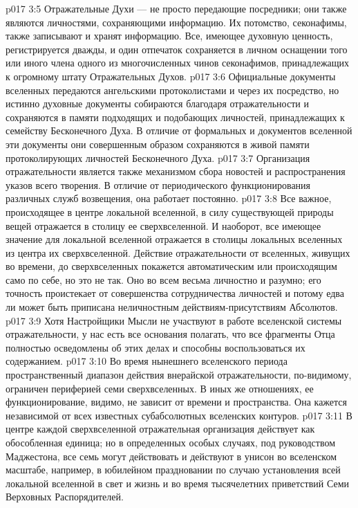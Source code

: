 \vs p017 3:5 \pc Отражательные Духи --- не просто передающие посредники; они также являются личностями, сохраняющими информацию. Их потомство, секонафимы, также записывают и хранят информацию. Все, имеющее духовную ценность, регистрируется дважды, и один отпечаток сохраняется в личном оснащении того или иного члена одного из многочисленных чинов секонафимов, принадлежащих к огромному штату Отражательных Духов.
\vs p017 3:6 Официальные документы вселенных передаются ангельскими протоколистами и через их посредство, но истинно духовные документы собираются благодаря отражательности и сохраняются в памяти подходящих и подобающих личностей, принадлежащих к семейству Бесконечного Духа. В отличие от формальных и  документов вселенной эти документы  они совершенным образом сохраняются в живой памяти протоколирующих личностей Бесконечного Духа.
\vs p017 3:7 Организация отражательности является также механизмом сбора новостей и распространения указов всего творения. В отличие от периодического функционирования различных служб возвещения, она работает постоянно.
\vs p017 3:8 Все важное, происходящее в центре локальной вселенной, в силу существующей природы вещей отражается в столицу ее сверхвселенной. И наоборот, все имеющее значение для локальной вселенной отражается в столицы локальных вселенных из центра их сверхвселенной. Действие отражательности от вселенных, живущих во времени, до сверхвселенных покажется автоматическим или происходящим само по себе, но это не так. Оно во всем весьма личностно и разумно; его точность проистекает от совершенства сотрудничества личностей и потому едва ли может быть приписана неличностным действиям\hyp{}присутствиям Абсолютов.
\vs p017 3:9 Хотя Настройщики Мысли не участвуют в работе вселенской системы отражательности, у нас есть все основания полагать, что все фрагменты Отца полностью осведомлены об этих делах и способны воспользоваться их содержанием.
\vs p017 3:10 \pc Во время нынешнего вселенского периода пространственный диапазон действия внерайской отражательности, по\hyp{}видимому, ограничен периферией семи сверхвселенных. В иных же отношениях, ее функционирование, видимо, не зависит от времени и пространства. Она кажется независимой от всех известных субабсолютных вселенских контуров.
\vs p017 3:11 В центре каждой сверхвселенной отражательная организация действует как обособленная единица; но в определенных особых случаях, под руководством Маджестона, все семь могут действовать и действуют в унисон во вселенском масштабе, например, в юбилейном праздновании по случаю установления всей локальной вселенной в свет и жизнь и во время тысячелетних приветствий Семи Верховных Распорядителей.
